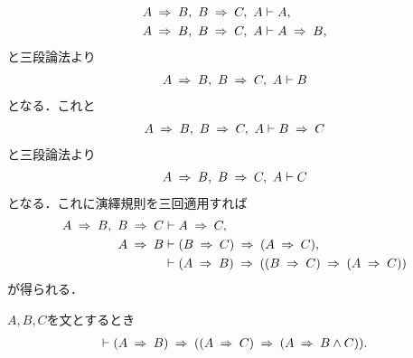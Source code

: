 	\begin{prf}
		\begin{align}
			A \rarrow B,\ B \rarrow C,\ A &\vdash A, \\
			A \rarrow B,\ B \rarrow C,\ A &\vdash A \rarrow B, \\
		\end{align}
		と三段論法より
		\begin{align}
			A \rarrow B,\ B \rarrow C,\ A \vdash B
		\end{align}
		となる．これと
		\begin{align}
			A \rarrow B,\ B \rarrow C,\ A \vdash B \rarrow C
		\end{align}
		と三段論法より
		\begin{align}
			A \rarrow B,\ B \rarrow C,\ A \vdash C
		\end{align}
		となる．これに演繹規則を三回適用すれば
		\begin{align}
			A \rarrow B,\ B \rarrow C &\vdash A \rarrow C, \\
			A \rarrow B &\vdash (B \rarrow C) \rarrow (A \rarrow C), \\
			&\vdash (A \rarrow B) \rarrow ((B \rarrow C) \rarrow (A \rarrow C))
		\end{align}
		が得られる．
		\QED
	\end{prf}
	
	\begin{screen}
		\begin{logicalthm}[二式が同時に導かれるならその論理積が導かれる]
		\label{logicalthm:conjunction_of_consequences}
			$A,B,C$を文とするとき
			\begin{align}
				\vdash (A \rarrow B) \rarrow ((A \rarrow C) 
				\rarrow (A \rarrow B \wedge C)).
			\end{align}
		\end{logicalthm}
	\end{screen}
	
